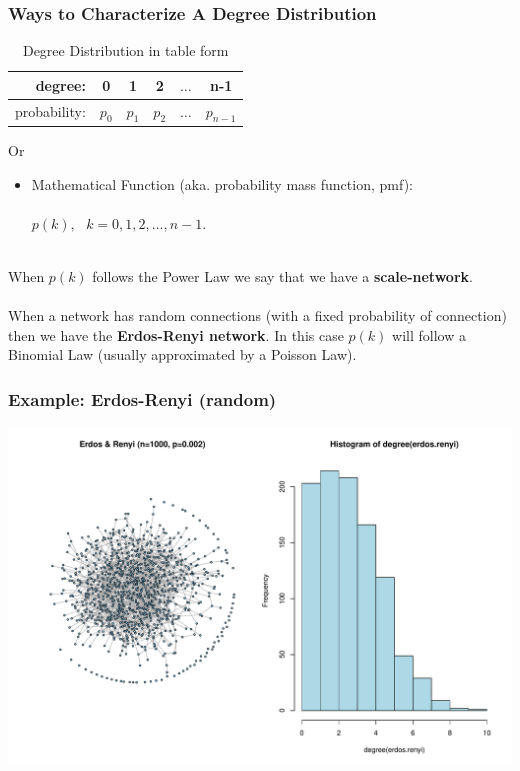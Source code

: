 \documentclass[smaller]{beamer}
\begin{document}
\begin{frame}
\frametitle{Ways to Characterize A Degree Distribution} 
\begin{table}[ht]
\caption{Degree Distribution in table form} 
\centering 
\begin{tabular}{r c c c c c}
\hline
degree: & 0 & 1 & 2 & $\dots$ & n-1 \\  \hline
probability: & $p_0$ & $p_1$ & $p_2$ & $\dots$ & $p_{n-1}$ 
\end{tabular}
\end{table}
Or
\begin{itemize}
\item Mathematical Function (aka. probability mass function, pmf):\\
${}_{}$\\
$p(k),~~~k=0,1,2, \dots, n-1$. 
\end{itemize}
${}_{}$\\
When $p(k)$ follows the Power Law we say that we have a {\bf scale-network}.\\
${}_{}$\\
When a network has random connections (with a fixed probability of connection) then
we have the {\bf Erdos-Renyi network}. In this case $p(k)$ will follow a Binomial Law 
(usually approximated by a Poisson Law).
\end{frame}

\begin{frame}
\frametitle{Example: Erdos-Renyi (random)}
\includegraphics[scale=0.4]{figures/erdos_renyi.pdf} 
\end{frame}
\end{document}
